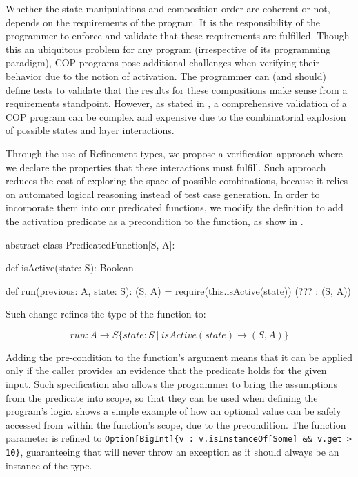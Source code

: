 Whether the state manipulations and composition order are coherent or not, depends on the 
requirements of the program. It is the responsibility of the programmer to enforce and validate that 
these requirements are fulfilled. Though this an ubiquitous problem for any program (irrespective of its 
programming paradigm), \ac{COP} programs pose additional challenges when verifying their behavior 
due to the notion of activation. The programmer can (and should) define tests to validate that the 
results for these compositions make sense from a requirements standpoint. However, as stated
in , a comprehensive validation of a \ac{COP} program can be 
complex and expensive due to the combinatorial explosion of possible states and layer interactions.

Through the use of Refinement types, we propose a verification approach where
we declare the properties that these interactions must fulfill. 
Such approach reduces the cost of exploring the space of possible combinations, because it relies on automated logical reasoning instead of test case generation.
In order to incorporate them into our predicated functions, we modify the  
definition to add the activation predicate as a precondition to the  function, as show in 
.

\begin{scala}[label=lst:predicated-function-run-precondition, caption=Refinement of the input state type]
abstract class PredicatedFunction[S, A]:

  def isActive(state: S): Boolean

  def run(previous: A, state: S): (S, A) =
    require(this.isActive(state))
    (??? : (S, A))
\end{scala}

Such change refines the type of the  function to:

$$
run : A \rightarrow S\{state: S  \: | \: isActive(state) \rightarrow (S, A)\}
$$

Adding the pre-condition to the  function's  argument means that it can be 
applied only if the caller provides an evidence that the  predicate holds for the given 
 input. Such specification also allows the programmer to bring the assumptions from the 
 predicate into scope, so that they can be used when defining the program's logic. 
 shows a simple example of how an optional 
value can be safely accessed from within the  function's scope, due to the  
precondition. The  function parameter is refined to \lstinline|Option[BigInt]{v : v.isInstanceOf[Some] && v.get > 10}|, guaranteeing that  will never throw an exception as it should always be an instance of the  type.

